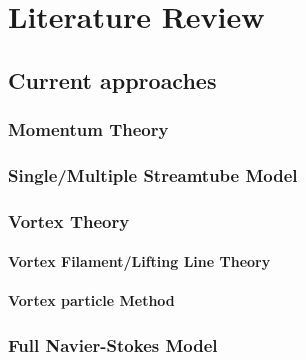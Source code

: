 \chapter{Literature Review}
\label{ch:LiteratureReview}


\section{Current approaches}

\subsection{Momentum Theory}

\subsection{Single/Multiple Streamtube Model}

\subsection{Vortex Theory}

\subsubsection{Vortex Filament/Lifting Line Theory}

\subsubsection{Vortex particle Method}

\subsection{Full Navier-Stokes Model}

